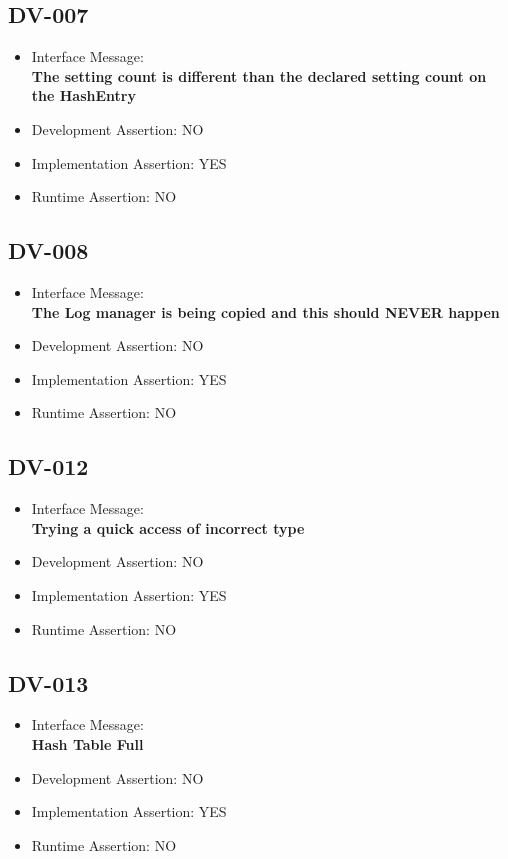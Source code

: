 \subsection{DV-007}
\begin{itemize}
  \item Interface Message:\\[1em]
    \textbf{The setting count is different than the declared setting count on the HashEntry}
  \item Development Assertion: NO
  \item Implementation Assertion: YES
  \item Runtime Assertion: NO
\end{itemize}

\subsection{DV-008}
\begin{itemize}
  \item Interface Message:\\[1em]
    \textbf{The Log manager is being copied and this should NEVER happen}
  \item Development Assertion: NO
  \item Implementation Assertion: YES
  \item Runtime Assertion: NO
\end{itemize}

\subsection{DV-012}
\begin{itemize}
  \item Interface Message:\\[1em]
    \textbf{Trying a quick access of incorrect type}
  \item Development Assertion: NO
  \item Implementation Assertion: YES
  \item Runtime Assertion: NO
\end{itemize}

\subsection{DV-013}
\begin{itemize}
  \item Interface Message:\\[1em]
    \textbf{Hash Table Full}
  \item Development Assertion: NO
  \item Implementation Assertion: YES
  \item Runtime Assertion: NO
\end{itemize}

